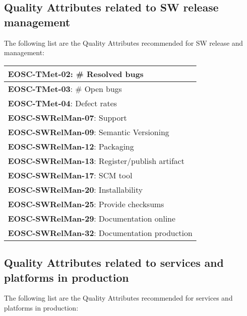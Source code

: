 \subsection{Quality Attributes related to SW release management}

The following list are the Quality Attributes recommended for SW release and management:

\begin{center}
    \tablehead{\hline}
    \tabletail{\hline}
    \label{tab:rs_rel}
    \small
    \begin{supertabular}{|p{\linewidth}|}
    \textbf{EOSC-TMet-02}: \# Resolved bugs \\ \hline
    \textbf{EOSC-TMet-03}: \# Open bugs \\ \hline
    \textbf{EOSC-TMet-04}: Defect rates \\ \hline
    \textbf{EOSC-SWRelMan-07}: Support \\ \hline
    \textbf{EOSC-SWRelMan-09}: Semantic Versioning \\ \hline
    \textbf{EOSC-SWRelMan-12}: Packaging \\ \hline
    \textbf{EOSC-SWRelMan-13}: Register/publish artifact \\ \hline
    \textbf{EOSC-SWRelMan-17}: SCM tool \\ \hline
    \textbf{EOSC-SWRelMan-20}: Installability \\ \hline
    \textbf{EOSC-SWRelMan-25}: Provide checksums \\ \hline
    \textbf{EOSC-SWRelMan-29}: Documentation online \\ \hline
    \textbf{EOSC-SWRelMan-32}: Documentation production \\ \hline
    \end{supertabular}
\end{center}

\subsection{Quality Attributes related to services and platforms in production}

The following list are the Quality Attributes recommended for services and platforms in production:


